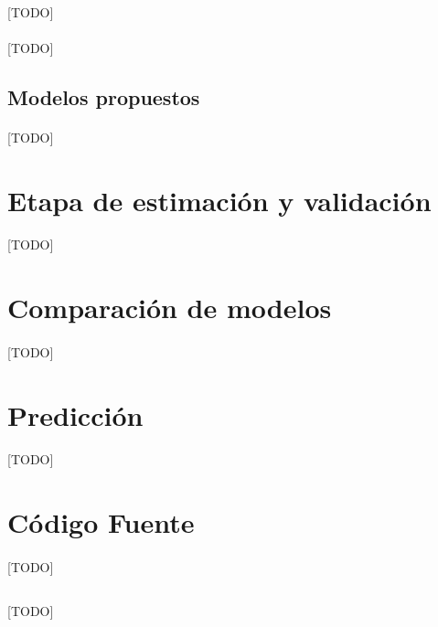 \documentclass[a4paper, spanish]{article}
\begin{document}
        \paragraph{}
        [TODO]

    \paragraph{}
    [TODO]

    \subsection{Modelos propuestos}
    \label{sec:proposed_models}

      \paragraph{}
      [TODO]

  \section{Etapa de estimación y validación}
  \label{sec:fitting}

    \paragraph{}
    [TODO]

  \section{Comparación de modelos}
  \label{sec:comparison}

    \paragraph{}
    [TODO]

  \section{Predicción}
  \label{sec:prediction}

    \paragraph{}
    [TODO]

  \appendix
  \section{Código Fuente}
  \label{sec:code}

    \paragraph{}
    [TODO]


    \begin{listing}[H]
        \centering
        \inputminted{R}{./res/code/weight-loss.r}
        \caption{[TODO]}
        \label{}
      \end{listing}
\end{document}

